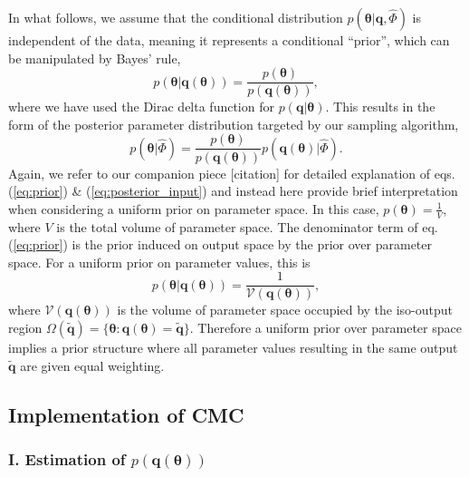 In what follows, we assume that the conditional distribution $p(\boldsymbol{\theta}|\boldsymbol{q}, \hat{\Phi})$ is independent of the data, meaning it represents a conditional ``prior'', which can be manipulated by Bayes' rule,
%
\begin{equation}\label{eq:prior}
p(\boldsymbol{\theta}|\boldsymbol{q}(\boldsymbol{\theta})) = \frac{p(\boldsymbol{\theta})}{p(\boldsymbol{q}(\boldsymbol{\theta}))},
\end{equation}
%
where we have used the Dirac delta function for $p(\boldsymbol{q}|\boldsymbol{\theta})$. This results in the form of the posterior parameter distribution targeted by our sampling algorithm,
%
\begin{equation}\label{eq:posterior_input}
p(\boldsymbol{\theta}|\hat{\Phi}) = \frac{p(\boldsymbol{\theta})}{p(\boldsymbol{q}(\boldsymbol{\theta}))} p(\boldsymbol{q}(\boldsymbol{\theta})|\hat{\Phi}).
\end{equation}
%
Again, we refer to our companion piece [citation] for detailed explanation of eqs. (\ref{eq:prior}) \& (\ref{eq:posterior_input}) and instead here provide brief interpretation when considering a uniform prior on parameter space. In this case, $p(\boldsymbol{\theta}) = \frac{1}{V}$, where $V$ is the total volume of parameter space. The denominator term of eq. (\ref{eq:prior}) is the prior induced on output space by the prior over parameter space. For a uniform prior on parameter values, this is %
%
\begin{equation}\label{eq:contour_volume}
p(\boldsymbol{\theta}|\boldsymbol{q}(\boldsymbol{\theta})) = \frac{1}{\mathcal{V}(\boldsymbol{q}(\boldsymbol{\theta}))},
\end{equation}
%
where $\mathcal{V}(\boldsymbol{q}(\boldsymbol{\theta}))$ is the volume of parameter space occupied by the iso-output region $\Omega(\tilde{\boldsymbol{q}}) = \{\boldsymbol{\theta}: \boldsymbol{q}(\boldsymbol{\theta}) = \tilde{\boldsymbol{q}}\}$. Therefore a uniform prior over parameter space implies a prior structure where all  parameter values resulting in the same output $\tilde{\boldsymbol{q}}$ are given equal weighting.

\subsection{Implementation of CMC}

\subsubsection{I. Estimation of $p(\boldsymbol{q}(\boldsymbol{\theta}))$}

